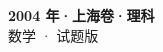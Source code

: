 \documentclass[zihao=-4, a4paper]{ctexart}
\begin{document}
\begin{center}
  {\Large\bfseries 2004 年·上海卷·理科}\\[4pt]
  {\large 数学 · 试题版}
\end{center}
\medskip
{}

\end{document}
